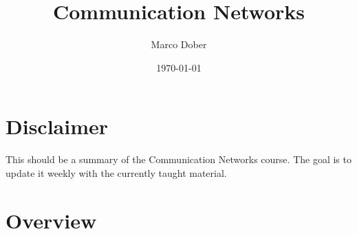 \documentclass[a4paper, fontsize=8pt, landscape, DIV=1]{scrartcl}
\title{Communication Networks}
\author{Marco Dober}
\date{\today}
\begin{document}
	\setcounter{secnumdepth}{2} %
	\begin{multicols*}{4}
		\section*{Disclaimer}
			This should be a summary of the Communication Networks course. The goal is to update it weekly with the currently taught material.  	
			\pagebreak

		\maketitle 
		\thispagestyle{fancy}
		
		\section{Overview}

\end{multicols*}
\end{document}
